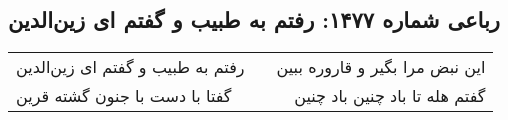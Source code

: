 \begin{center}
\section*{رباعی شماره ۱۴۷۷: رفتم به طبیب و گفتم ای زین‌الدین}
\label{sec:1477}
\begin{longtable}{l p{0.5cm} r}
رفتم به طبیب و گفتم ای زین‌الدین
&&
این نبض مرا بگیر و قاروره ببین
\\
گفتا با دست با جنون گشته قرین
&&
گفتم هله تا باد چنین باد چنین
\\
\end{longtable}
\end{center}
